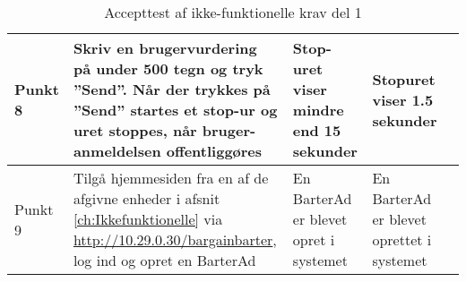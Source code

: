 \begin{table}[H]
\begin{tabular}{ |p{1.4cm}|p{5.0cm}|p{5.0cm}|p{3.8cm}|p{1.0cm}| }
		\hline
		Punkt 8 & Skriv en brugervurdering på under 500 tegn og tryk ''Send''. Når der trykkes på ''Send'' startes et stop-ur og uret stoppes, når bruger-anmeldelsen offentliggøres & Stop-uret viser mindre end 15 sekunder & Stopuret viser 1.5 sekunder & \checkmark \\
		\hline
		Punkt 9 & Tilgå hjemmesiden fra en af de afgivne enheder i afsnit \ref{ch:Ikkefunktionelle} via \url{http://10.29.0.30/bargainbarter}, log ind og opret en BarterAd  & En BarterAd er blevet opret i systemet & En BarterAd er blevet oprettet i systemet & \checkmark \\
		\hline
	\end{tabular}
	\caption{Accepttest af ikke-funktionelle krav del 1}
	\label{table:accepttest_udfort}
\end{table}
